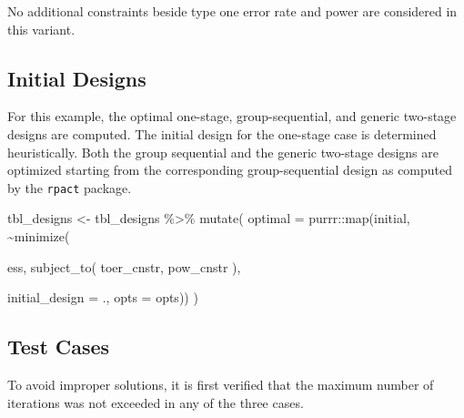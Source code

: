 \documentclass[
]{book}
\newenvironment{Shaded}{\begin{snugshade}}{\end{snugshade}}
\newcommand{\AttributeTok}[1]{\textcolor[rgb]{0.77,0.63,0.00}{#1}}
\newcommand{\FunctionTok}[1]{\textcolor[rgb]{0.00,0.00,0.00}{#1}}
\newcommand{\NormalTok}[1]{#1}
\newcommand{\OtherTok}[1]{\textcolor[rgb]{0.56,0.35,0.01}{#1}}
\newcommand{\SpecialCharTok}[1]{\textcolor[rgb]{0.00,0.00,0.00}{#1}}
\begin{document}
No additional constraints beside type one error rate and power are considered in this variant.

\hypertarget{initial-designs-2}{%
\subsection{Initial Designs}\label{initial-designs-2}}

For this example, the optimal one-stage, group-sequential, and generic two-stage designs are computed. The initial design for the one-stage case is determined heuristically. Both the group sequential and the generic two-stage designs are optimized starting from the corresponding group-sequential design as computed by the \texttt{rpact} package.

\begin{Shaded}
\begin{Highlighting}[]
\NormalTok{tbl\_designs }\OtherTok{\textless{}{-}}\NormalTok{ tbl\_designs }\SpecialCharTok{\%\textgreater{}\%} 
    \FunctionTok{mutate}\NormalTok{(}
       \AttributeTok{optimal =}\NormalTok{ purrr}\SpecialCharTok{::}\FunctionTok{map}\NormalTok{(initial, }\SpecialCharTok{\textasciitilde{}}\FunctionTok{minimize}\NormalTok{(}
         
\NormalTok{          ess,}
          \FunctionTok{subject\_to}\NormalTok{(}
\NormalTok{              toer\_cnstr,}
\NormalTok{              pow\_cnstr}
\NormalTok{          ),}
          
          \AttributeTok{initial\_design =}\NormalTok{ ., }
          \AttributeTok{opts           =}\NormalTok{ opts)) )}
\end{Highlighting}
\end{Shaded}

\hypertarget{test-cases-17}{%
\subsection{Test Cases}\label{test-cases-17}}

To avoid improper solutions, it is first verified that the maximum number of iterations was not exceeded in any of the three cases.

\begin{Shaded}
\end{Shaded}
\end{document}
